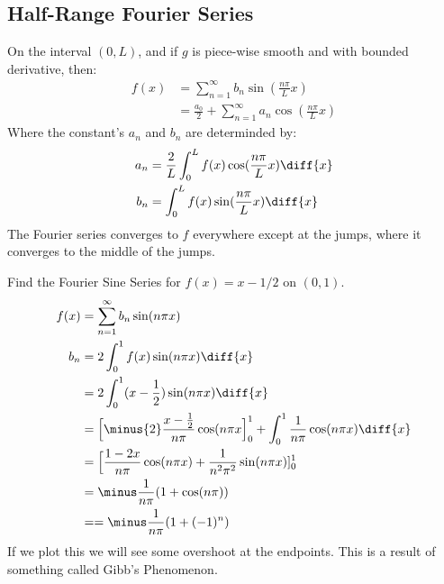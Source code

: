 \documentclass[crop=false,class=book,oneside]{standalone}
\begin{document}
        \subsection{Half-Range Fourier Series}
            On the interval $(0, L)$, and if $g$ is piece-wise smooth
            and with bounded derivative, then:
            \begin{align}
                f(x)&=\sum_{n=1}^{\infty}b_{n}\sin(\frac{n\pi}{L}x)\\
                &=\frac{a_{0}}{2}+\sum_{n=1}^{\infty}
                    a_{n}\cos(\frac{n\pi}{L}x)
            \end{align}
            Where the constant's $a_{n}$ and $b_{n}$ are determinded by:
            \begin{align}
                a_{n}&=\frac{2}{L}
                    \int_{0}^{L}f(x)\cos(\frac{n\pi}{L}x)\diff{x}\\
                b_{n}&=
                    \int_{0}^{L}f(x)\sin(\frac{n\pi}{L}x)\diff{x}
            \end{align}
            The Fourier series converges to $f$ everywhere except at the
            jumps, where it converges to the middle of the jumps.
            \begin{lexample}
                Find the Fourier Sine Series for $f(x)=x-1/2$ on $(0,1)$.
                \begin{align}
                    f(x)&=\sum_{n=1}^{\infty}b_{n}\sin(n\pi{x})\\
                    b_{n}&=2\int_{0}^{1}f(x)\sin(n\pi{x})\diff{x}\\
                    &=2\int_{0}^{1}(x-\frac{1}{2})\sin(n\pi{x})\diff{x}\\
                    &=\Big[
                        \minus{2}\frac{x-\frac{1}{2}}{n\pi}\cos(n\pi{x}
                    \Big]_{0}^{1}+
                    \int_{0}^{1}\frac{1}{n\pi}\cos(n\pi{x})\diff{x}\\
                    &=\Big[
                        \frac{1-2x}{n\pi}\cos(n\pi{x})+
                        \frac{1}{n^{2}\pi^{2}}\sin(n\pi{x})
                    ]_{0}^{1}\\
                    &=\minus\frac{1}{n\pi}(1+\cos(n\pi))\\
                    &==\minus\frac{1}{n\pi}(1+(-1)^{n})
                \end{align}
                If we plot this we will see some overshoot at the endpoints.
                This is a result of something called Gibb's Phenomenon.
            \end{lexample}
\end{document}
